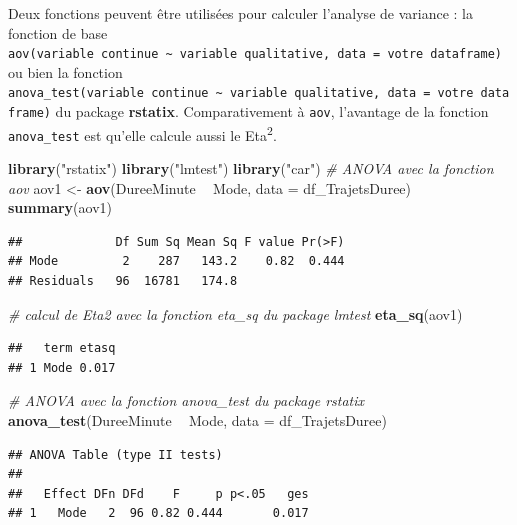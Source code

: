 \documentclass[
  11pt,
  french,
]{book}
\makeatletter
\newenvironment{Shaded}{\begin{snugshade}}{\end{snugshade}}
\newcommand{\CommentTok}[1]{\textcolor[rgb]{0.56,0.35,0.01}{\textit{#1}}}
\newcommand{\DataTypeTok}[1]{\textcolor[rgb]{0.13,0.29,0.53}{#1}}
\newcommand{\KeywordTok}[1]{\textcolor[rgb]{0.13,0.29,0.53}{\textbf{#1}}}
\newcommand{\NormalTok}[1]{#1}
\newcommand{\OperatorTok}[1]{\textcolor[rgb]{0.81,0.36,0.00}{\textbf{#1}}}
\newcommand{\StringTok}[1]{\textcolor[rgb]{0.31,0.60,0.02}{#1}}
\newenvironment{kframe}{%
\medskip{}
\setlength{\fboxsep}{.8em}
 \def\at@end@of@kframe{}%
 \ifinner\ifhmode%
  \def\at@end@of@kframe{\end{minipage}}%
  \begin{minipage}{\columnwidth}%
 \fi\fi%
 \def\FrameCommand##1{\hskip\@totalleftmargin \hskip-\fboxsep
 \colorbox{shadecolor}{##1}\hskip-\fboxsep
     \hskip-\linewidth \hskip-\@totalleftmargin \hskip\columnwidth}%
 \MakeFramed {\advance\hsize-\width
   \@totalleftmargin\z@ \linewidth\hsize
   \@setminipage}}%
 {\par\unskip\endMakeFramed%
 \at@end@of@kframe}
\renewenvironment{Shaded}{\begin{kframe}}{\end{kframe}}
\makeatother
\begin{document}
Deux fonctions peuvent être utilisées pour calculer l'analyse de variance : la fonction de base \texttt{aov(variable\ continue\ \textasciitilde{}\ variable\ qualitative,\ data\ =\ votre\ dataframe)} ou bien la fonction \texttt{anova\_test(variable\ continue\ \textasciitilde{}\ variable\ qualitative,\ data\ =\ votre\ dataframe)} du package \textbf{rstatix}. Comparativement à \texttt{aov}, l'avantage de la fonction \texttt{anova\_test} est qu'elle calcule aussi le Eta\textsuperscript{2}.

\begin{Shaded}
\begin{Highlighting}[]
\KeywordTok{library}\NormalTok{(}\StringTok{"rstatix"}\NormalTok{)}
\KeywordTok{library}\NormalTok{(}\StringTok{"lmtest"}\NormalTok{)}
\KeywordTok{library}\NormalTok{(}\StringTok{"car"}\NormalTok{)}
\CommentTok{# ANOVA avec la fonction aov}
\NormalTok{aov1 <-}\StringTok{ }\KeywordTok{aov}\NormalTok{(DureeMinute }\OperatorTok{~}\StringTok{ }\NormalTok{Mode, }\DataTypeTok{data =}\NormalTok{ df_TrajetsDuree)}
\KeywordTok{summary}\NormalTok{(aov1)}
\end{Highlighting}
\end{Shaded}

\begin{verbatim}
##             Df Sum Sq Mean Sq F value Pr(>F)
## Mode         2    287   143.2    0.82  0.444
## Residuals   96  16781   174.8
\end{verbatim}

\begin{Shaded}
\begin{Highlighting}[]
\CommentTok{# calcul de Eta2 avec la fonction eta_sq du package lmtest}
\KeywordTok{eta_sq}\NormalTok{(aov1)}
\end{Highlighting}
\end{Shaded}

\begin{verbatim}
##   term etasq
## 1 Mode 0.017
\end{verbatim}

\begin{Shaded}
\begin{Highlighting}[]
\CommentTok{# ANOVA avec la fonction anova_test du package rstatix}
\KeywordTok{anova_test}\NormalTok{(DureeMinute }\OperatorTok{~}\StringTok{ }\NormalTok{Mode, }\DataTypeTok{data =}\NormalTok{ df_TrajetsDuree)}
\end{Highlighting}
\end{Shaded}

\begin{verbatim}
## ANOVA Table (type II tests)
## 
##   Effect DFn DFd    F     p p<.05   ges
## 1   Mode   2  96 0.82 0.444       0.017
\end{verbatim}
\end{document}
